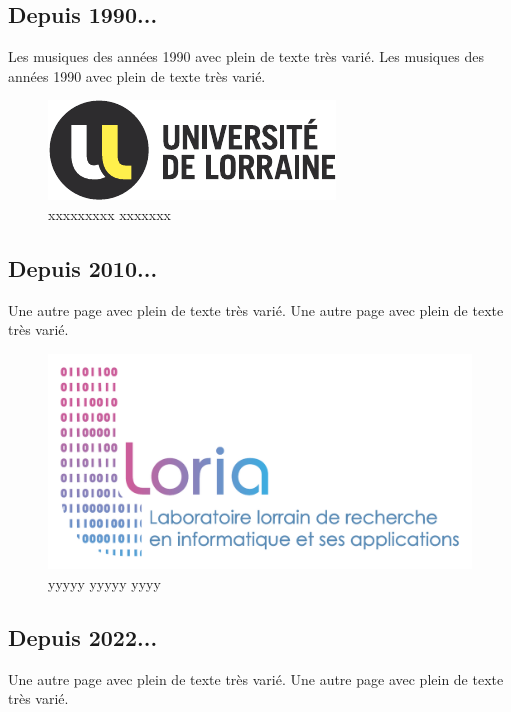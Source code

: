         \subsection{Depuis 1990...}
            Les musiques des années \gls{1990} avec plein de texte très varié.
            Les musiques des années \gls{1990} avec plein de texte très varié.

            \begin{figure}[htb]
                \includegraphics{tulul}
                \caption{xxxxxxxxx xxxxxxx\label{rintintin1}}
            \end{figure}

        \subsection{Depuis 2010...}
            Une autre page avec plein de texte très varié.
            Une autre page avec plein de texte très varié.

            \begin{figure}[htb]
                \includegraphics{tulloria}
                \caption{yyyyy yyyyy yyyy\label{rintintin2}}
            \end{figure}

        \subsection{Depuis 2022...}
            Une autre page avec plein de texte très varié.
            Une autre page avec plein de texte très varié.

